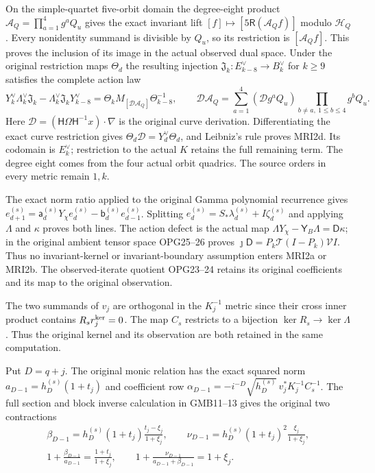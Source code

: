 \documentclass[11pt,a4paper]{article}
\begin{document}
On the simple-quartet five-orbit domain the degree-eight
product $\mathcal A_Q=\prod_{a=1}^4g^aQ_u$ gives the
exact invariant lift $[f]\mapsto[5\mathsf R(\mathcal A_Qf)]$
modulo $\mathcal H_Q$. Every nonidentity summand is divisible
by $Q_u$, so its restriction is $[\mathcal A_Qf]$.
This proves the inclusion of its image in the actual observed
dual space. Under the original restriction maps $\Theta_d$
the resulting injection $\mathfrak J_k:E_{k-8}^\vee\to B_k^\vee$
for $k\ge9$ satisfies the complete action law
\[
 Y_k^\vee\Lambda_k^\vee\mathfrak J_k
  -\Lambda_k^\vee\mathfrak J_kY_{k-8}^\vee
 =\Theta_kM_{[\mathcal D\mathcal A_Q]}\Theta_{k-8}^{-1},\qquad
 \mathcal D\mathcal A_Q=\sum_{a=1}^4(\mathcal D g^aQ_u)
                          \prod_{b\ne a,\ 1\le b\le4}g^bQ_u.
 \tag{MRI2d}
\]
Here $\mathcal D=(\mathsf H\Omega\mathsf H^{-1}x)\cdot\nabla$
is the original curve derivation. Differentiating the exact
curve restriction gives $\Theta_d\mathcal D=Y_d^\vee\Theta_d$,
and Leibniz's rule proves MRI2d. Its codomain is $E_k^\vee$;
restriction to the actual $K$ retains the full remaining term.
The degree eight comes from the four actual orbit quadrics.
The source orders in every metric remain $1,k$.

The exact norm ratio applied to the original Gamma polynomial
recurrence gives
$e_{d+1}^{(s)}=\mathsf a_d^{(s)}Y_\chi e_d^{(s)}
-\mathsf b_d^{(s)}e_{d-1}^{(s)}$. Splitting
$e_d^{(s)}=S_*\lambda_d^{(s)}+I\zeta_d^{(s)}$ and applying
$\Lambda$ and $\kappa$ proves both lines. The action defect is
the actual map
$\Lambda Y_\chi-\mathsf Y_B\Lambda=\mathsf D\kappa$;
in the original ambient tensor space OPG25--26 proves
$\jmath\mathsf D=P_k\mathcal T(I-P_k)\mathcal V I$.
Thus no invariant-kernel or invariant-boundary assumption enters
MRI2a or MRI2b. The observed-iterate quotient OPG23--24 retains
its original coefficients and its map to the original observation.

The two summands of $v_j$ are orthogonal in the $K_j^{-1}$
metric since their cross inner product contains $R_sr_j^{\rm ker}=0$.
The map $C_s$ restricts to a bijection
$\ker R_s\to\ker\Lambda$. Thus the original kernel and its
observation are both retained in the same computation.

Put $D=q+j$. The original monic relation has the exact squared
norm $a_{D-1}=h_D^{(s)}(1+t_j)$ and coefficient row
$\alpha_{D-1}=-i^{-D}\sqrt{h_D^{(s)}}\,
v_j^*K_j^{-1}C_s^{-1}$. The full section and block inverse
calculation in GMB11--13 gives the original two contractions
\[
\begin{gathered}
 \beta_{D-1}=h_D^{(s)}(1+t_j)\frac{t_j-\xi_j}{1+\xi_j},
 \qquad
 \nu_{D-1}=h_D^{(s)}(1+t_j)^2\frac{\xi_j}{1+\xi_j},\\
 1+\frac{\beta_{D-1}}{a_{D-1}}
          =\frac{1+t_j}{1+\xi_j},\qquad
 1+\frac{\nu_{D-1}}{a_{D-1}+\beta_{D-1}}=1+\xi_j.
\end{gathered}\tag{MRI3}
\]
\end{document}
